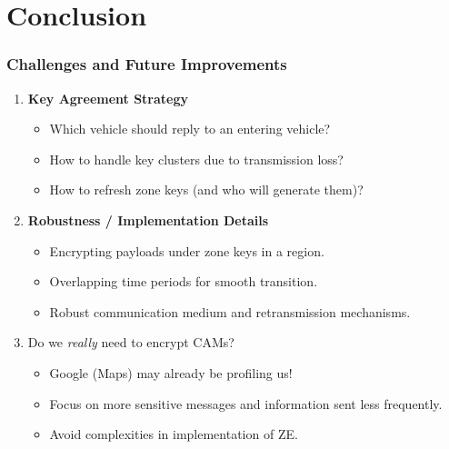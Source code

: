 \documentclass{beamer}
\begin{document}
    \section{Conclusion}
    \begin{frame}
        \frametitle{Challenges and Future Improvements}
        \begin{enumerate}
            \item<1-> \textbf{Key Agreement Strategy}
            \begin{itemize}
                \item Which vehicle should reply to an entering vehicle?
                \item How to handle key clusters due to transmission loss?
                \item How to refresh zone keys (and who will generate them)?
            \end{itemize}
            \item<2-> \textbf{Robustness / Implementation Details}
            \begin{itemize}
                \item Encrypting payloads under zone keys in a region.
                \item Overlapping time periods for smooth transition.
                \item Robust communication medium and retransmission mechanisms.
            \end{itemize}
            \item<3-> Do we \emph{really} need to encrypt CAMs?
            \begin{itemize}
                \item Google (Maps) may already be profiling us!
                \item Focus on more sensitive messages and information sent less
                frequently.
                \item Avoid complexities in implementation of ZE.
            \end{itemize}
        \end{enumerate}
    \end{frame}
\end{document}
